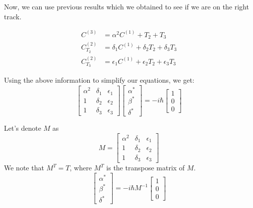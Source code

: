 \documentclass[11pt,a4paper]{article}
\begin{document}
Now, we can use previous results which we obtained to see if we are on the right track.

\begin{align*}
C^{(3)} &=   \alpha^2  C^{(1)}  +T_2  +T_3 \\
C^{(2)}_{T_2}&= \delta_1 C^{(1)} + \delta_2 T_2 + \delta_3 T_3 \\
C^{(2)}_{T_3}&= \epsilon_1 C^{(1)} + \epsilon_2 T_2 + \epsilon_3 T_3 
\end{align*}

Using the above information to simplify our equations, we get:
\begin{equation}
\begin{bmatrix}
    \alpha^2       & \delta_{1} & \epsilon_{1} \\
    1     & \delta_{2} & \epsilon_{2} \\
    1      & \delta_{3} & \epsilon_{3}
\end{bmatrix}
\begin{bmatrix}
\alpha^* \\
\beta^* \\
\delta^*   
   \end{bmatrix}
=
- i \hbar \begin{bmatrix}
1 \\
0 \\
0   
   \end{bmatrix}
\end{equation}

Let's denote  $M$ as 
\begin{equation}
M=\begin{bmatrix}
    \alpha^2       & \delta_{1} & \epsilon_{1} \\
    1     & \delta_{2} & \epsilon_{2} \\
    1      & \delta_{3} & \epsilon_{3}
\end{bmatrix}
\end{equation}
We note that $M^{T}= T$, where $M^{T}$ is the transpose matrix of $M$. 
\begin{equation}
\begin{bmatrix}
\alpha^* \\
\beta^* \\
\delta^*   
   \end{bmatrix}
=
- i \hbar M^{-1} \begin{bmatrix}
1 \\
0 \\
0   
   \end{bmatrix}
\end{equation}
\end{document}

